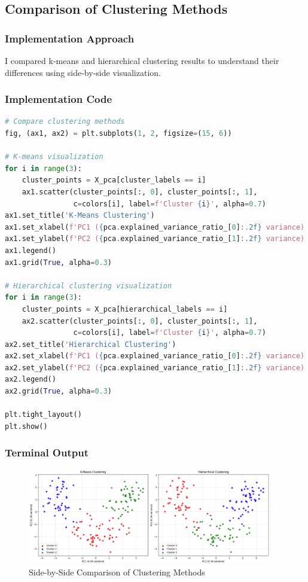 \documentclass[12pt,a4paper]{article}
\begin{document}
\subsection{Comparison of Clustering Methods}

\subsubsection{Implementation Approach}
I compared k-means and hierarchical clustering results to understand their differences using side-by-side visualization.

\subsubsection{Implementation Code}
\begin{lstlisting}[language=Python, caption=Clustering Methods Comparison]
# Compare clustering methods
fig, (ax1, ax2) = plt.subplots(1, 2, figsize=(15, 6))

# K-means visualization
for i in range(3):
    cluster_points = X_pca[cluster_labels == i]
    ax1.scatter(cluster_points[:, 0], cluster_points[:, 1], 
                c=colors[i], label=f'Cluster {i}', alpha=0.7)
ax1.set_title('K-Means Clustering')
ax1.set_xlabel(f'PC1 ({pca.explained_variance_ratio_[0]:.2f} variance)')
ax1.set_ylabel(f'PC2 ({pca.explained_variance_ratio_[1]:.2f} variance)')
ax1.legend()
ax1.grid(True, alpha=0.3)

# Hierarchical clustering visualization
for i in range(3):
    cluster_points = X_pca[hierarchical_labels == i]
    ax2.scatter(cluster_points[:, 0], cluster_points[:, 1], 
                c=colors[i], label=f'Cluster {i}', alpha=0.7)
ax2.set_title('Hierarchical Clustering')
ax2.set_xlabel(f'PC1 ({pca.explained_variance_ratio_[0]:.2f} variance)')
ax2.set_ylabel(f'PC2 ({pca.explained_variance_ratio_[1]:.2f} variance)')
ax2.legend()
ax2.grid(True, alpha=0.3)

plt.tight_layout()
plt.show()
\end{lstlisting}

\subsubsection{Terminal Output}
\begin{figure}[h!]
\centering
    \includegraphics[width=0.95\textwidth]{Figures/clustering_comparison.png}
    \caption{Side-by-Side Comparison of Clustering Methods}
\end{figure}
\end{document}
